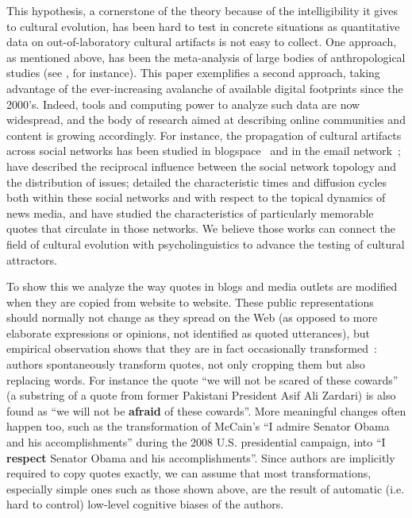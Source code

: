 \begin{new}
This hypothesis, a cornerstone of the theory because of the intelligibility it gives to cultural evolution, has been hard to test in concrete situations as quantitative data on out-of-laboratory cultural artifacts is not easy to collect.
One approach, as mentioned above, has been the meta-analysis of large bodies of anthropological studies (see \citealp{miton_universal_2015}, for instance).
This paper exemplifies a second approach, taking advantage of the ever-increasing avalanche of available digital footprints since the 2000's.
Indeed, tools and computing power to analyze such data are now widespread, and the body of research aimed at describing online communities and content is growing accordingly.
For instance, the propagation of cultural artifacts across social networks has been studied in blogspace~\citep{gruhl_information_2004} and in the email network~\citep{liben-nowell_tracing_2008};
\citet{cointet_socio-semantic_2009} have described the reciprocal influence between the social network topology and the distribution of issues;
\citet{leskovec_meme-tracking_2009} detailed the characteristic times and diffusion cycles both within these social networks and with respect to the topical dynamics of news media, and \citet{danescu-niculescu-mizil_you_2012} have studied the characteristics of particularly memorable quotes that circulate in those networks.
We believe those works can connect the field of cultural evolution with psycholinguistics to advance the testing of cultural attractors.

\bigskip

To show this we analyze the way quotes in blogs and media outlets are modified when they are copied from website to website.
These public representations should normally not change as they spread on the Web (as opposed to more elaborate expressions or opinions, not identified as quoted utterances), but empirical observation shows that they are in fact occasionally transformed~\citep{simmons_memes_2011}:
authors spontaneously transform quotes, not only cropping them but also replacing words.
For instance the quote ``we will not be scared of these cowards'' (a substring of a quote from former Pakistani President Asif Ali Zardari) is also found as ``we will not be \textbf{afraid} of these cowards''.
More meaningful changes often happen too, such as the transformation of McCain's ``I admire Senator Obama and his accomplishments'' during the 2008 U.S. presidential campaign, into ``I \textbf{respect} Senator Obama and his accomplishments''.
Since authors are implicitly required to copy quotes exactly, we can assume that most transformations, especially simple ones such as those shown above, are the result of automatic (\hbox{i.e.} hard to control) low-level cognitive biases of the authors.


\end{new}
